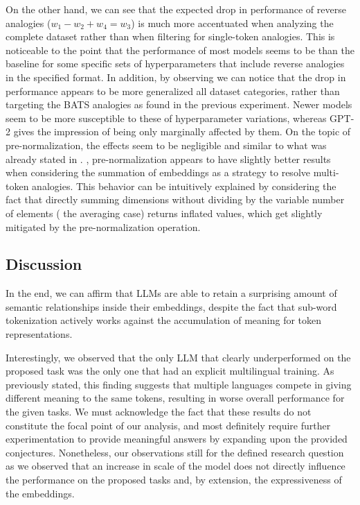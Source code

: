 On the other hand, we can see that the expected drop in performance of reverse analogies ($w_1 - w_2 + w_4 = w_3$) is much more accentuated when analyzing the complete dataset rather than when filtering for single-token analogies.
This is noticeable to the point that the performance of most models seems to be  than the baseline for some specific sets of hyperparameters that include reverse analogies in the specified format.
In addition, by observing  we can notice that the drop in performance appears to be more generalized  all dataset categories, rather than targeting the BATS analogies as found in the previous experiment.
Newer models seem to be more susceptible to these  of hyperparameter variations, whereas GPT-2 gives the impression of being only marginally affected by them.
On the topic of pre-normalization, the effects seem to be negligible and similar to what was already stated in .
, pre-normalization appears to have slightly better results when considering the summation of embeddings as a strategy to resolve multi-token analogies.
This behavior can be intuitively explained by considering the fact that directly summing dimensions without dividing by the variable number of elements ( the averaging case) returns inflated values, which get slightly mitigated by the pre-normalization operation.


\subsection{Discussion}

In the end, we can affirm that LLMs are able to retain a surprising amount of semantic relationships inside their embeddings, despite the fact that sub-word tokenization actively works against the accumulation of meaning for token representations.

Interestingly, we observed that the only LLM that clearly underperformed on the proposed task was the only one that had an explicit multilingual training.
As previously stated, this finding suggests that multiple languages compete in giving different meaning to the same tokens, resulting in worse overall performance for the given tasks.
We must acknowledge the fact that these results do not constitute the focal point of our analysis, and most definitely require further experimentation to provide meaningful answers by expanding upon the provided conjectures.
Nonetheless, our observations still  for the defined research question as we observed that an increase in scale of the model does not directly influence the performance on the proposed tasks and, by extension, the expressiveness of the embeddings.

